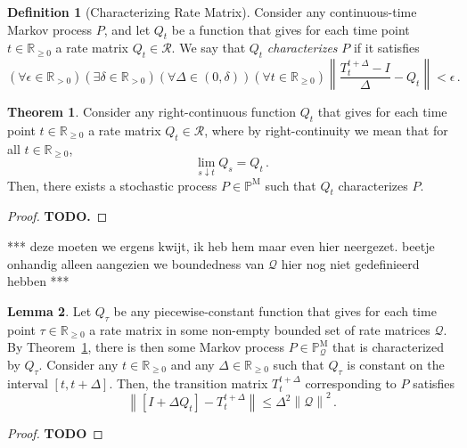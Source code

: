 \documentclass[10pt]{paper}
\theoremstyle{definition}
\newtheorem{theorem}{Theorem}
\newtheorem{lemma}[theorem]{Lemma}
\newtheorem{definition}{Definition}
\newcommand{\reals}{\mathbb{R}}
\newcommand{\realspos}{\reals_{>0}}
\newcommand{\realsnonneg}{\reals_{\geq 0}}
\newcommand{\processes}{\mathbb{P}}
\newcommand{\mprocesses}{\processes^{\mathrm{M}}}
\newcommand{\rateset}{\mathcal{Q}}
\newcommand{\norm}[1]{\left\lVert #1 \right\rVert}
\begin{document}
\begin{definition}[Characterizing Rate Matrix]\label{def:markov_process_char_matrix}
Consider any continuous-time Markov process $P$, and let $Q_t$ be a function that gives for each time point $t\in\realsnonneg$ a rate matrix $Q_t\in\mathcal{R}$. We say that $Q_t$ \emph{characterizes} $P$ if it satisfies
\begin{equation*}
(\forall \epsilon\in\realspos)(\exists \delta\in\realspos)(\forall \Delta\in(0,\delta))(\forall t\in\realsnonneg)\norm{\frac{T_t^{t+\Delta} - I}{\Delta} - Q_t} < \epsilon\,.
\end{equation*}
\end{definition}

\begin{theorem}\label{theorem:continuous_rate_matrix_has_process}
Consider any right-continuous function $Q_t$ that gives for each time point $t\in\realsnonneg$ a rate matrix $Q_t\in\mathcal{R}$, where by right-continuity we mean that for all $t\in\realsnonneg$,
\begin{equation*}
\lim_{s\downarrow t} Q_s = Q_t\,.
\end{equation*}
Then, there exists a stochastic process $P\in\mprocesses$ such that $Q_t$ characterizes $P$.
\end{theorem}
\begin{proof}
{\bf TODO.}
\end{proof}

*** deze moeten we ergens kwijt, ik heb hem maar even hier neergezet. beetje onhandig alleen aangezien we boundedness van $\rateset$ hier nog niet gedefinieerd hebben ***

\begin{lemma}\label{lemma:bound_precise_linear_approx}
Let $Q_\tau$ be any piecewise-constant function that gives for each time point $\tau\in\realsnonneg$ a rate matrix in some non-empty bounded set of rate matrices $\rateset$. By Theorem~\ref{theorem:continuous_rate_matrix_has_process}, there is then some Markov process $P\in\mprocesses_\rateset$ that is characterized by $Q_\tau$. Consider any $t\in\realsnonneg$ and any $\Delta\in\realsnonneg$ such that $Q_\tau$ is constant on the interval $[t,t+\Delta]$. Then, the transition matrix $T_t^{t+\Delta}$ corresponding to $P$ satisfies
\begin{equation*}
\norm{\left[I + \Delta Q_t\right] - T_t^{t+\Delta}} \leq \Delta^2\norm{\rateset}^2\,.
\end{equation*}
\end{lemma}
\begin{proof}
{\bf TODO}
\end{proof}
\end{document}
